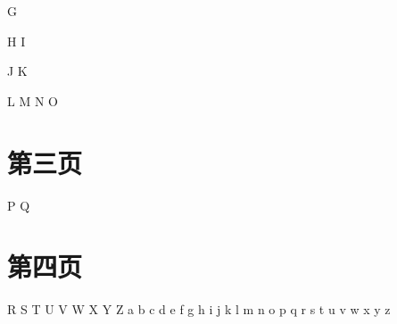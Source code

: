 \documentclass[twoside]{article}
\begin{document}
    \newcommand{\bfit}[1]{\textbf{\textit{#1}}}
    G

    H
    I

    J %
    K %

    L
    M
    N
    O

\newpage

\section{第三页}
    P
    Q

\newpage

\section{第四页}
    R
    S
    T
    U
    V
    W
    X
    Y
    Z
    a
    b
    c
    d
    e
    f
    g
    h
    i
    j
    k
    l
    m
    n
    o
    p
    q
    r
    s
    t
    u
    v
    w
    x
    y
    z


\printindex
\printindex[g1]
\printindex[g2]
\end{document}
